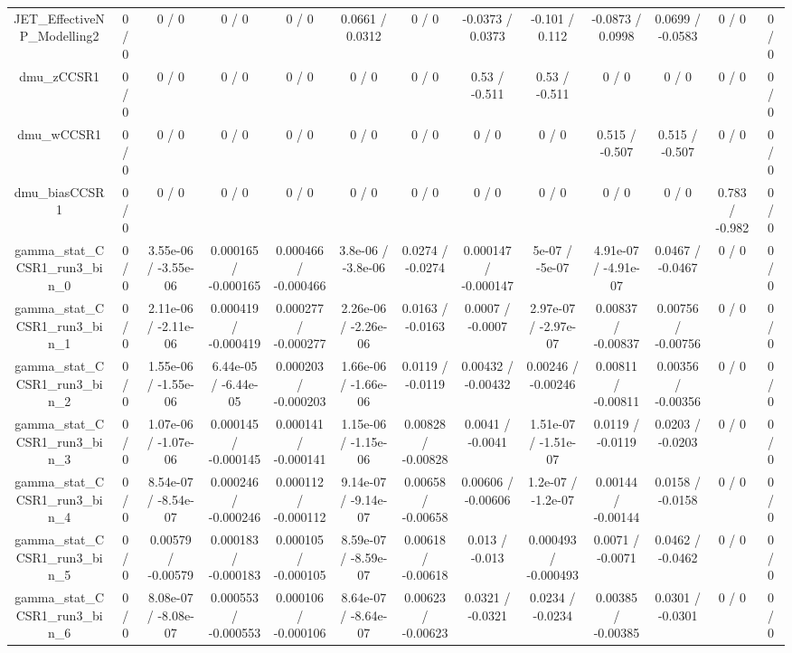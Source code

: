 \documentclass[10pt]{article}
\begin{document}
\begin{table}[htbp]
\begin{center}
\begin{tabular}{|c|c|c|c|c|c|c|c|c|c|c|c|c|}
  JET_EffectiveNP_Modelling2 & 0 / 0 & 0 / 0 & 0 / 0 & 0 / 0 & 0.0661 / 0.0312 & 0 / 0 & -0.0373 / 0.0373 & -0.101 / 0.112 & -0.0873 / 0.0998 & 0.0699 / -0.0583 & 0 / 0 & 0 / 0 \\ 
  dmu_zCCSR1 & 0 / 0 & 0 / 0 & 0 / 0 & 0 / 0 & 0 / 0 & 0 / 0 & 0.53 / -0.511 & 0.53 / -0.511 & 0 / 0 & 0 / 0 & 0 / 0 & 0 / 0 \\ 
  dmu_wCCSR1 & 0 / 0 & 0 / 0 & 0 / 0 & 0 / 0 & 0 / 0 & 0 / 0 & 0 / 0 & 0 / 0 & 0.515 / -0.507 & 0.515 / -0.507 & 0 / 0 & 0 / 0 \\ 
  dmu_biasCCSR1 & 0 / 0 & 0 / 0 & 0 / 0 & 0 / 0 & 0 / 0 & 0 / 0 & 0 / 0 & 0 / 0 & 0 / 0 & 0 / 0 & 0.783 / -0.982 & 0 / 0 \\ 
  gamma_stat_CCSR1_run3_bin_0 & 0 / 0 & 3.55e-06 / -3.55e-06 & 0.000165 / -0.000165 & 0.000466 / -0.000466 & 3.8e-06 / -3.8e-06 & 0.0274 / -0.0274 & 0.000147 / -0.000147 & 5e-07 / -5e-07 & 4.91e-07 / -4.91e-07 & 0.0467 / -0.0467 & 0 / 0 & 0 / 0 \\ 
  gamma_stat_CCSR1_run3_bin_1 & 0 / 0 & 2.11e-06 / -2.11e-06 & 0.000419 / -0.000419 & 0.000277 / -0.000277 & 2.26e-06 / -2.26e-06 & 0.0163 / -0.0163 & 0.0007 / -0.0007 & 2.97e-07 / -2.97e-07 & 0.00837 / -0.00837 & 0.00756 / -0.00756 & 0 / 0 & 0 / 0 \\ 
  gamma_stat_CCSR1_run3_bin_2 & 0 / 0 & 1.55e-06 / -1.55e-06 & 6.44e-05 / -6.44e-05 & 0.000203 / -0.000203 & 1.66e-06 / -1.66e-06 & 0.0119 / -0.0119 & 0.00432 / -0.00432 & 0.00246 / -0.00246 & 0.00811 / -0.00811 & 0.00356 / -0.00356 & 0 / 0 & 0 / 0 \\ 
  gamma_stat_CCSR1_run3_bin_3 & 0 / 0 & 1.07e-06 / -1.07e-06 & 0.000145 / -0.000145 & 0.000141 / -0.000141 & 1.15e-06 / -1.15e-06 & 0.00828 / -0.00828 & 0.0041 / -0.0041 & 1.51e-07 / -1.51e-07 & 0.0119 / -0.0119 & 0.0203 / -0.0203 & 0 / 0 & 0 / 0 \\ 
  gamma_stat_CCSR1_run3_bin_4 & 0 / 0 & 8.54e-07 / -8.54e-07 & 0.000246 / -0.000246 & 0.000112 / -0.000112 & 9.14e-07 / -9.14e-07 & 0.00658 / -0.00658 & 0.00606 / -0.00606 & 1.2e-07 / -1.2e-07 & 0.00144 / -0.00144 & 0.0158 / -0.0158 & 0 / 0 & 0 / 0 \\ 
  gamma_stat_CCSR1_run3_bin_5 & 0 / 0 & 0.00579 / -0.00579 & 0.000183 / -0.000183 & 0.000105 / -0.000105 & 8.59e-07 / -8.59e-07 & 0.00618 / -0.00618 & 0.013 / -0.013 & 0.000493 / -0.000493 & 0.0071 / -0.0071 & 0.0462 / -0.0462 & 0 / 0 & 0 / 0 \\ 
  gamma_stat_CCSR1_run3_bin_6 & 0 / 0 & 8.08e-07 / -8.08e-07 & 0.000553 / -0.000553 & 0.000106 / -0.000106 & 8.64e-07 / -8.64e-07 & 0.00623 / -0.00623 & 0.0321 / -0.0321 & 0.0234 / -0.0234 & 0.00385 / -0.00385 & 0.0301 / -0.0301 & 0 / 0 & 0 / 0 \\ 

\end{tabular}
\end{center}
\end{table}
\end{document}
